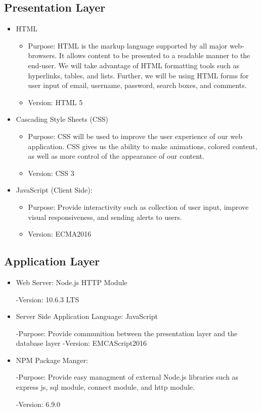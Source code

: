\documentclass[letter, 12pt, titlepage]{article}
\begin{document}
			\subsection{Presentation Layer}
			\begin{itemize}
			 \item HTML
				\begin{itemize}
					\item Purpose: HTML is the markup language supported by all major web-browsers. It allows content to be presented to a readable manner to the end-user. We will take advantage of HTML formatting tools such as hyperlinks, tables, and lists. Further, we will be using HTML forms for user input of email, username, password, search boxes, and comments.
					\item Version: HTML 5
				\end{itemize}
			\item Cascading Style Sheets (CSS)
			\begin{itemize}	
				\item Purpose: CSS will be used to improve the user experience of our web application. CSS gives us the ability to make animations, colored content, as well as more control of the appearance of our content.
				\item Version: CSS 3
			\end{itemize}
			\item	JavaScript (Client Side):
				\begin{itemize}
					\item	Purpose: Provide interactivity such as collection of user input, improve visual responsiveness, and sending alerts to users.
					\item Version: ECMA2016
				\end{itemize}
			\end{itemize}

		\subsection{Application Layer}
		\begin{itemize}
			\item Web Server: Node.js HTTP Module
			
				-Version: 10.6.3 LTS
			
			\item Server Side Application Language: JavaScript
				
				-Purpose: Provide communition between the presentation layer and the database layer
				-Version: EMCAScript2016

			\item	NPM Package Manger:

				-Purpose: Provide easy managment of external Node.js libraries such as express js, sql module, connect module, and http module.

				-Version: 6.9.0 
		\end{itemize}	
\end{document}
